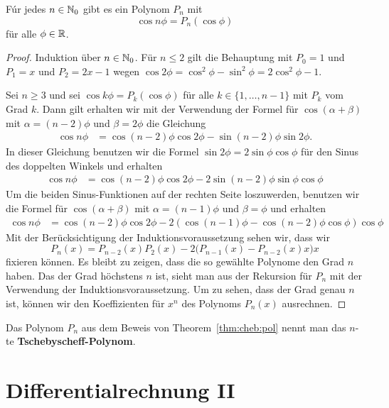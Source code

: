 \begin{thm} \label{thm:cheb:pol}
	Fúr jedes $n \in \mathbb{N}_0$ gibt es ein Polynom $P_n$ mit 
	\[
		\cos n \phi = P_n(\cos \phi)
	\]
	für alle $\phi \in \mathbb{R}$. 
\end{thm} 
\begin{proof}
	Induktion über $n \in \mathbb{N}_0$. Für $n \le 2$ gilt die Behauptung mit $P_0=1$ und $P_1=x$ und $P_2=2  x-1$ wegen $\cos 2 \phi = \cos^2 \phi - \sin^2 \phi = 2 \cos^2 \phi -1$. 
	
	
	 Sei  $n \ge 3$ und sei  $\cos k \phi  = P_k(\cos \phi)$ für alle $k \in \{1,\ldots,n-1\}$ mit $P_k$ vom Grad $k$. Dann gilt erhalten wir mit der Verwendung der Formel für $\cos(\alpha+\beta)$ mit $\alpha = (n-2)\phi$ und $\beta = 2 \phi$ die Gleichung 
	\begin{align*}
			\cos n \phi & = \cos (n-2) \phi \cos 2 \phi - \sin (n-2) \phi \sin 2 \phi. 
	\end{align*} 
	In dieser Gleichung benutzen wir die Formel $\sin 2 \phi = 2 \sin \phi \cos \phi$ für den Sinus des doppelten Winkels und erhalten 
	\begin{align*}
	\cos n \phi & = \cos (n-2) \phi \cos 2 \phi - 2 \sin (n-2) \phi \sin \phi \cos \phi
	\end{align*} 
	Um die beiden Sinus-Funktionen auf der rechten Seite loszuwerden, benutzen wir die Formel für $\cos(\alpha + \beta)$ mit $\alpha = (n-1)\phi$ und $\beta= \phi$ und erhalten 
	\begin{align*}
	\cos n \phi & = \cos (n-2) \phi \cos 2 \phi - 2 (\cos (n-1) \phi  - \cos (n-2)\phi \cos \phi)  \cos \phi
	\end{align*} 
	Mit der Berücksichtigung der Induktionsvoraussetzung sehen wir, dass wir 
	\[
			P_n(x) = P_{n-2}(x) P_2(x) - 2 \bigl( P_{n-1}(x) - P_{n-2}(x) x\bigr) x
	\]
	fixieren können. Es bleibt zu zeigen, dass die so gewählte Polynome den Grad $n$ haben. Das der Grad höchstens $n$ ist, sieht man aus der Rekursion für $P_n$ mit der Verwendung der Induktionsvoraussetzung. Um zu sehen, dass der Grad genau $n$ ist, können wir den Koeffizienten für $x^n$ des Polynoms $P_n(x)$ ausrechnen.
\end{proof} 

\begin{defn}
	Das Polynom $P_n$ aus dem Beweis von Theorem~\ref{thm:cheb:pol} nennt man das $n$-te \textbf{Tschebyscheff-Polynom}.
\end{defn}


\chapter{Differentialrechnung II}

